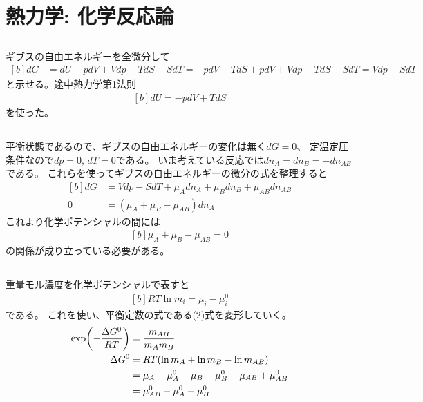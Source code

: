 \documentclass[../../sp_2013.tex]{subfiles}
\begin{document}
\section{熱力学: 化学反応論}
\subsection{}
ギブスの自由エネルギーを全微分して
\begin{equation}\begin{aligned}[b]
    dG &= dU + pdV + Vdp - TdS - SdT
    = -pdV + TdS + pdV + Vdp - TdS - SdT
    = Vdp - SdT
\end{aligned}\end{equation}
と示せる。途中熱力学第1法則
\begin{equation}\begin{aligned}[b]
    dU = -pdV +TdS
\end{aligned}\end{equation}
を使った。
\subsection{}
平衡状態であるので、ギブスの自由エネルギーの変化は無く\(dG = 0\)、
定温定圧条件なので\(dp=0,\,dT=0\)である。
いま考えている反応では\(dn_A = dn_B = -dn_{AB}\)である。
これらを使ってギブスの自由エネルギーの微分の式を整理すると
\begin{equation}\begin{aligned}[b]
    dG &= Vdp - SdT +\mu_A dn_A +\mu_Bdn_B +\mu_{AB}dn_{AB}\\
    0 &= (\mu_A+\mu_B-\mu_{AB})dn_A
\end{aligned}\end{equation}
これより化学ポテンシャルの間には
\begin{equation}\begin{aligned}[b]
    \mu_A+\mu_B-\mu_{AB}=0
\end{aligned}\end{equation}
の関係が成り立っている必要がある。

\subsection{}
重量モル濃度を化学ポテンシャルで表すと
\begin{equation}\begin{aligned}[b]
    RT\ln m_i = \mu_i - \mu_i^0
\end{aligned}\end{equation}
である。
これを使い、平衡定数の式である(2)式を変形していく。
\begin{equation}\begin{aligned}[b]
    \exp(-\frac{\Delta G^0}{RT}) &= \frac{m_{AB}}{m_Am_B}\\
    \Delta G^0 &= RT\qty(\ln m_A + \ln m_B -\ln m_{AB})\\
    &= \mu_A -\mu_A^0 +\mu_B - \mu_B^0 -\mu_{AB} + \mu_{AB}^0\\
    &= \mu_{AB}^0 -\mu_A^0 -\mu_B^0
\end{aligned}\end{equation}
\end{document}
